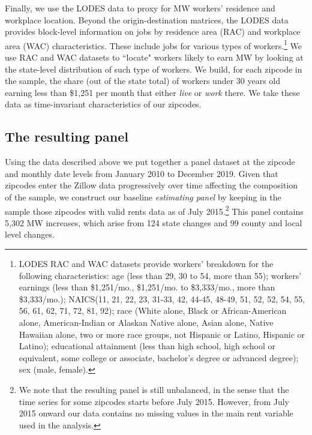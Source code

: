 Finally, we use the LODES data to proxy for MW workers' residence and workplace location. 
Beyond the origin-destination matrices, the LODES data provides block-level information on 
jobs by residence area (RAC) and workplace area (WAC) characteristics. These include jobs 
for various types of workers.\footnote{LODES RAC and WAC datasets provide workers' breakdown 
	for the following characteristics: age (less than 29, 30 to 54, more than 55); workers' 
	earnings (less than \$1,251/mo., \$1,251/mo. to \$3,333/mo., more than \$3,333/mo.); 
	NAICS(11, 21, 22, 23, 31-33, 42, 44-45, 48-49, 51, 52, 52, 54, 55, 56, 61, 62, 71, 72, 
	81, 92); race (White alone, Black or African-American alone, American-Indian or Alaskan 	
	Native alone, Asian alone, Native Hawaiian alone, two or more race groups, not Hispanic 
	or Latino, Hispanic or Latino); educational attainment (less than high school, high 
	school or equivalent, some college or associate, bachelor's degree or advanced degree); 
	sex (male, female).} 
We use RAC and WAC datasets to ``locate" workers likely to earn MW by looking at the 
state-level distribution of such type of workers. We build, for each zipcode in the sample, 
the share (out of the state total) of workers under 30 years old earning less than \$1,251 
per month that either \textit{live} or \textit{work} there. We take these data as 
time-invariant characteristics of our zipcodes.


\subsection{The resulting panel}

Using the data described above we put together a panel dataset at the zipcode and monthly 
date levels from January 2010 to December 2019. Given that zipcodes enter the Zillow data 
progressively over time affecting the composition of the sample, we construct our baseline 
\textit{estimating panel} by keeping in the sample those zipcodes with valid rents data as 
of July 2015.\footnote{We note that the resulting panel is still unbalanced, in the sense 
	that the time series for some zipcodes starts before July 2015. However, from July
	2015 onward our data contains no missing values in the main rent variable used in the 
	analysis.} 
This panel contains 5,302 MW increases, which arise from 124 state changes 
and 99 county and local level changes.

